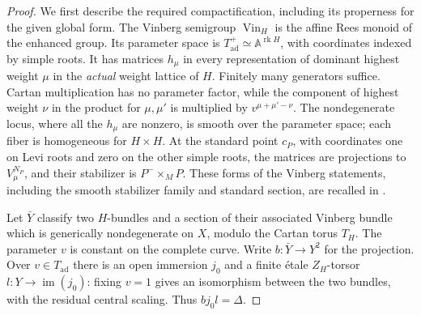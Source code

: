 \begin{proof}
We first describe the required compactification, including its properness
for the given global form.  The Vinberg semigroup $\operatorname{Vin}_H$
is the affine Rees monoid of the enhanced group.  Its parameter space is
$T_{\mathrm{ad}}^+\simeq\mathbb A^{\operatorname{rk}H}$, with coordinates
indexed by simple roots.  It has matrices $h_\mu$ in every representation
of dominant highest weight $\mu$ in the \emph{actual} weight lattice of
$H$.  Finitely many generators suffice.  Cartan multiplication has no
parameter factor, while the component of highest weight $\nu$ in the
product for $\mu,\mu'$ is multiplied by $v^{\mu+\mu'-\nu}$.
The nondegenerate locus, where all the $h_\mu$ are nonzero, is smooth over
the parameter space; each fiber is homogeneous for $H\times H$.
At the standard point $c_P$, with coordinates one on Levi roots and zero
on the other simple roots, the matrices are projections to
$V_\mu^{N_P}$, and their stabilizer is $P^-\times_M P$.
These forms of the Vinberg statements, including the smooth stabilizer
family and standard section, are recalled in
\cite[Appendices~C--D]{DrinfeldGaitsgoryCT}.

Let $\bar Y$ classify two $H$-bundles and a section of their associated
Vinberg bundle which is generically nondegenerate on $X$, modulo the
Cartan torus $T_H$.  The parameter $v$ is constant on the complete curve.
Write $b:\bar Y\to Y^2$ for the projection.  Over $v\in T_{\mathrm{ad}}$
there is an open immersion $j_0$ and a finite \'{e}tale $Z_H$-torsor
$l:Y\to\operatorname{im}(j_0)$: fixing $v=1$ gives an isomorphism between
the two bundles, with the residual central scaling.  Thus $bj_0l=\Delta$.


\end{proof}
